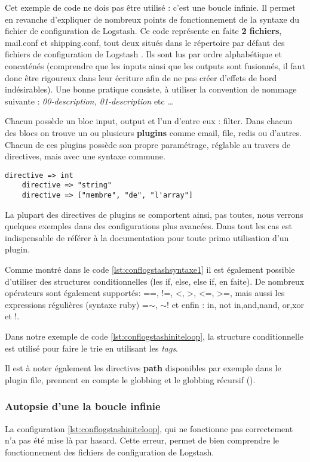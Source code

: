 Cet exemple de code ne dois pas être utilisé : c'est une boucle infinie.
Il permet en revanche d'expliquer de nombreux points de fonctionnement de la syntaxe
du fichier de configuration de Logstash.
Ce code représente en faite {\bfseries 2 fichiers}, mail.conf et shipping.conf, tout
deux situés dans le répertoire par défaut des fichiers de configuration de Logstash
. Ils sont lus par ordre alphabétique et concaténés 
(comprendre que les inputs ainsi que les outputs sont fusionnés, il faut donc être
rigoureux dans leur écriture afin de ne pas créer d'effets de bord indésirables).
Une bonne pratique consiste, à utiliser la convention de nommage suivante : \textit{
00-description, 01-description} etc \ldots


Chacun possède un bloc input, output et l'un d'entre eux : filter.
Dans chacun des blocs on trouve un ou plusieurs {\bfseries plugins} comme email, 
file, redis ou d'autres. 
Chacun de ces plugins possède son propre paramétrage, réglable au travers de 
directives, mais avec une syntaxe commune.


\begin{lstlisting}[style=logstash,label={lst:conflogstashsyntaxe1},caption={Syntaxe}]
    directive => int
    directive => "string"
    directive => ["membre", "de", "l'array"]
\end{lstlisting}

La plupart des directives de plugins se comportent ainsi, pas toutes, nous
verrons quelques exemples dans des configurations plus avancées. Dans tout les cas 
est indispensable de référer à la documentation pour toute primo utilisation d'un
plugin.


Comme montré dans le code \ref{lst:conflogstashsyntaxe1} il est également possible 
d'utiliser des structures conditionnelles (les if, else, else if, en faite).
De nombreux opérateurs sont également supportés: ==, !=, <, >, <=, >=, mais aussi
les expressions régulières (syntaxe ruby) =$\sim$, $\sim$! et enfin : in, not in,and,nand,
or,xor et !. 

Dans notre exemple de code \ref{lst:conflogstashiniteloop}, la structure conditionnelle
est utilisé pour faire le trie en utilisant les \emph{tags}.

Il est à noter également les directives \textbf{path} disponibles par exemple dans
le plugin file, prennent en compte le globbing et le globbing récursif 
().

\subsubsection{Autopsie d'une la boucle infinie}
La configuration \ref{lst:conflogstashiniteloop}, qui ne fonctionne pas
correctement n'a pas été mise là par hasard. Cette erreur, permet de bien comprendre 
le fonctionnement des fichiers de configuration de Logstash.

